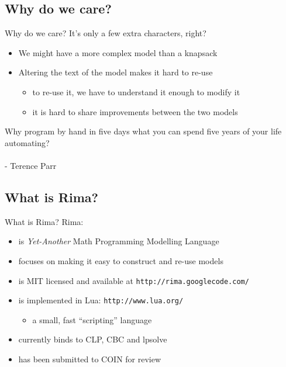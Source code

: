 \documentclass[smaller,handout]{beamer}
\begin{document}
\subsection{Why do we care?}
\begin{frame}{Why do we care?}
  It's only a few extra characters, right?
  \pause
  \begin{itemize}
    \item We might have a more complex model than a knapsack
    \vspace{1ex}
    \item Altering the text of the model makes it hard to re-use
      \begin{itemize}
        \item to re-use it, we have to understand it enough to modify it
        \item it is hard to share improvements between the two models
      \end{itemize}
  \end{itemize}
\end{frame}


\begin{frame}
  Why program by hand in five days what you can spend five years of your life automating?\\
  ~\\
  - Terence Parr
\end{frame}


\subsection{What is Rima?}
\begin{frame}{What is Rima?}
  Rima:
  \begin{itemize}
    \item is \emph{Yet-Another} Math Programming Modelling Language
    \item focuses on making it easy to construct and re-use models
  \end{itemize}
  \begin{itemize}
    \item is MIT licensed and available at {\tt http://rima.googlecode.com/}
    \item is implemented in Lua: {\tt http://www.lua.org/}
    \begin{itemize}\item a small, fast ``scripting'' language\end{itemize}
    \item currently binds to CLP, CBC and lpsolve
    \item has been submitted to COIN for review
  \end{itemize}
\end{frame}
\end{document}
